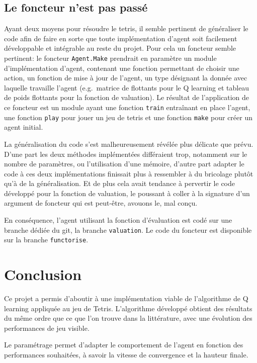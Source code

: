 \documentclass{report}
\begin{document}
\section{Le foncteur n'est pas passé}
Ayant deux moyens pour résoudre le tetris, il semble pertinent de
généraliser le code afin de faire en sorte que toute implémentation
d'agent soit facilement développable et intégrable au reste du projet. Pour
cela un foncteur semble pertinent: le foncteur \texttt{Agent.Make} prendrait en
paramètre un module d'implémentation d'agent, contenant une fonction
permettant de choisir une action, un fonction de mise \`a jour de l'agent, un
type d\'esignant la donnée avec laquelle travaille l'agent (e.g.\ matrice de
flottants pour le Q learning et tableau de poids flottants pour la fonction de
valuation). Le r\'esultat de l'application de ce foncteur est un module ayant
une fonction \texttt{train} entra\^inant en place l'agent, une fonction
\texttt{play} pour jouer un jeu de tetris et une fonction \texttt{make} pour
cr\'eer un agent initial.

La généralisation du code s'est malheureusement révélée plus
délicate que prévu. D'une part les deux méthodes implémentées
différaient trop, notamment sur le nombre de paramètres, ou
l'utilisation d'une mémoire, d'autre part adapter le code \`a ces deux
implémentations finissait plus \`a ressembler \`a du bricolage plutôt qu'\`a
de la généralisation. Et de plus cela avait tendance \`a pervertir le code
développé pour la fonction de valuation, le poussant \`a coller \`a la
signature d'un argument de foncteur qui est peut-être, avouons le, mal conçu.

En conséquence, l'agent utilisant la fonction d'évaluation est codé sur
une branche dédiée du git, la branche \texttt{valuation}. Le code du
foncteur est disponible sur la branche \texttt{functorise}.
\chapter*{Conclusion}
Ce projet a permis d'aboutir à une implémentation viable de l'algorithme de Q
learning appliquée au jeu de Tetris. L'algorithme développé obtient des
résultats du même ordre que ce que l'on trouve dans la littérature, avec une
évolution des performances de jeu visible.

Le paramétrage permet d'adapter le comportement de l'agent en fonction des
performances souhaitées, à savoir la vitesse de convergence et la hauteur
finale.
\end{document}
